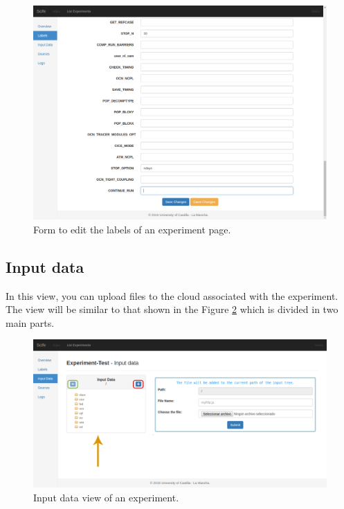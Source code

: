 \documentclass[11pt]{article}
\begin{document}
\begin{figure}[htp]
	\centering
	\includegraphics[width=\linewidth]{img/labels-edit}
	\caption{Form to edit the labels of an experiment page.}
	\label{fig:labels-edit}
\end{figure}

\subsection{Input data}\label{sec:inputData}
In this view, you can upload files to the cloud associated with the experiment. The view will be similar to that shown in the Figure \ref{fig:input-data} which is divided in two main parts.\\
\begin{figure}[htp]
	\centering
	\includegraphics[width=\linewidth]{img/input-data}
	\caption{Input data view of an experiment.}
	\label{fig:input-data}
\end{figure}
\end{document}
